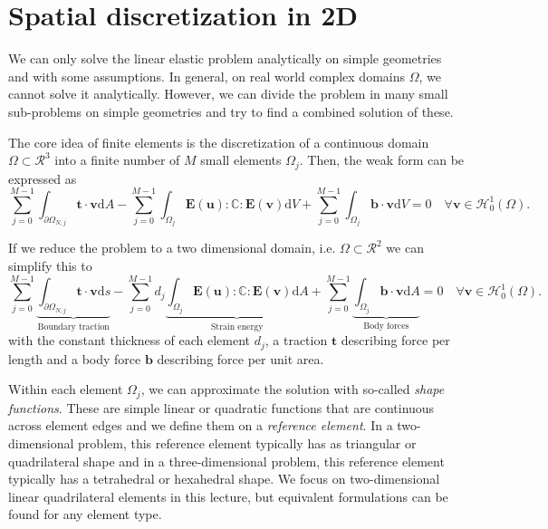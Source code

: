\section{Spatial discretization in 2D}
We can only solve the linear elastic problem analytically on simple geometries and with some assumptions. In general, on real world complex domains $\Omega$, we cannot solve it analytically. However, we can divide the problem in many small sub-problems on simple geometries and try to find a combined solution of these.

The core idea of finite elements is the discretization of a continuous domain $\Omega \subset \mathcal{R}^3$ into a finite number of $M$ small elements $\Omega_j$. Then, the weak form can be expressed as 
\begin{equation}
    \sum_{j=0}^{M-1} \int_{\partial \Omega_{N,j}} \mathbf{t} \cdot \mathbf{v} \text{d}A
    - \sum_{j=0}^{M-1} \int_{\Omega_j} \mathbf{E}(\mathbf{u}) : \mathbb{C} :  \mathbf{E}(\mathbf{v}) \text{d}V
    + \sum_{j=0}^{M-1} \int_{\Omega_j} \mathbf{b} \cdot \mathbf{v} \text{d}V = 0 \quad \forall \mathbf{v} \in \mathcal{H}^1_0 (\Omega).
    \label{eq:discretized_weak_form_3d}
\end{equation}

If we reduce the problem to a two dimensional domain, i.e. $\Omega \subset \mathcal{R}^2$ we can simplify this to  
\begin{equation}
    \sum_{j=0}^{M-1} 
    \underbrace{\int_{\partial \Omega_{N,j}} \mathbf{t} \cdot \mathbf{v} \text{d}s}_\textrm{Boundary traction}
    - \sum_{j=0}^{M-1} d_j  
    \underbrace{\int_{\Omega_j} \mathbf{E}(\mathbf{u}) : \mathbb{C} :  \mathbf{E}(\mathbf{v}) \text{d}A}_\textrm{Strain energy}
    + \sum_{j=0}^{M-1} \underbrace{\int_{\Omega_j} \mathbf{b} \cdot \mathbf{v} \text{d}A}_\textrm{Body forces} = 0 \quad \forall \mathbf{v} \in \mathcal{H}^1_0 (\Omega).
    \label{eq:discretized_weak_form}
\end{equation}
with the constant thickness of each element $d_j$, a traction $\mathbf{t}$ describing force per length and a body force $\mathbf{b}$ describing force per unit area.

Within each element $\Omega_j$, we can approximate the solution with so-called \emph{shape functions}. These are simple linear or quadratic functions that are continuous across element edges and we define them on a \emph{reference element}. In a two-dimensional problem, this reference element typically has as triangular or quadrilateral shape and in a three-dimensional problem, this reference element typically has a tetrahedral or hexahedral shape. We focus on two-dimensional linear quadrilateral elements in this lecture, but equivalent formulations can be found for any element type. 

